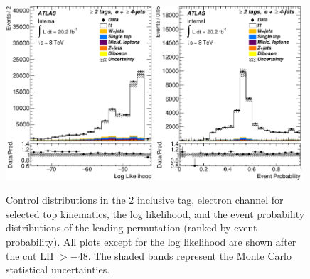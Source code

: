 \begin{figure}[!h]
\begin{center}
		\includegraphics[height=65mm]{chapters/whel/figures/control_Plots2/bTag_2incl_NoLHCut/LogLikelihood_el}
        \includegraphics[height=65mm]{chapters/whel/figures/control_Plots2/bTag_2incl/EventProbability_el}
	\caption{Control distributions in the 2 inclusive \bt tag, electron channel for selected top kinematics, the log likelihood, and the event probability distributions of the leading permutation (ranked by event probability). All plots except for the log likelihood are shown after the cut LH $> -48$. The shaded bands represent the Monte Carlo statistical uncertainties.}
	\label{fig:klfitter_control_plots_2}
	\end{center}    
	\end{figure}
	
